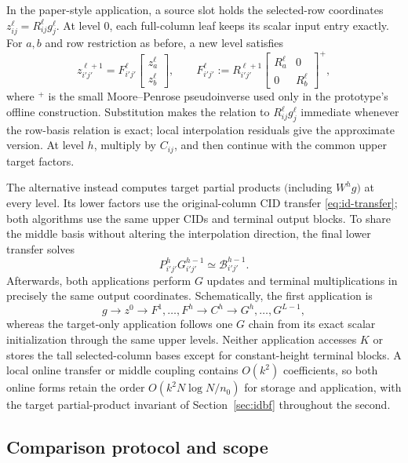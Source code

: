 \documentclass[11pt]{article}
\begin{document}
In the paper-style application, a source slot holds the selected-row coordinates $z_{ij}^{\ell}=R_{ij}^{\ell}g_j^{\ell}$.  At level $0$, each full-column leaf keeps its scalar input entry exactly.  For $a,b$ and row restriction as before, a new level satisfies
\[
 z_{i'j'}^{\ell+1}=F_{i'j'}^{\ell}
 \begin{bmatrix}z_a^{\ell}\\z_b^{\ell}\end{bmatrix},
 \qquad
 F_{i'j'}^{\ell}:=R_{i'j'}^{\ell+1}
 \begin{bmatrix}R_a^{\ell}&0\\0&R_b^{\ell}\end{bmatrix}^{+},
 \tag{24}\label{eq:id-source-transfer}
\]
where $^{+}$ is the small Moore--Penrose pseudoinverse used only in the prototype's offline construction.  Substitution makes the relation to $R_{ij}^{\ell}g_j^{\ell}$ immediate whenever the row-basis relation is exact; local interpolation residuals give the approximate version.  At level $h$, multiply by $C_{ij}$, and then continue with the common upper target factors.

The alternative instead computes target partial products $($including $W^hg$$)$ at every level.  Its lower factors use the original-column CID transfer \eqref{eq:id-transfer}; both algorithms use the same upper CIDs and terminal output blocks.  To share the middle basis without altering the interpolation direction, the final lower transfer solves
\[
 P_{i'j'}^{h}G_{i'j'}^{h-1}\simeq\mathcal B_{i'j'}^{h-1}.
 \tag{25}\label{eq:id-middle-align}
\]
Afterwards, both applications perform $G$ updates and terminal multiplications in precisely the same output coordinates.  Schematically, the first application is
\[
 g\longrightarrow z^0\longrightarrow F^1,\dots,F^h
 \longrightarrow C^h\longrightarrow G^h,\dots,G^{L-1},
\]
whereas the target-only application follows one $G$ chain from its exact scalar initialization through the same upper levels.  Neither application accesses $K$ or stores the tall selected-column bases except for constant-height terminal blocks.  A local online transfer or middle coupling contains $O(k^2)$ coefficients, so both online forms retain the order $O(k^2N\log N/n_0)$ for storage and application, with the target partial-product invariant of Section~\ref{sec:idbf} throughout the second.

\subsection{Comparison protocol and scope}
\label{sec:idbf-protocol}
\end{document}
